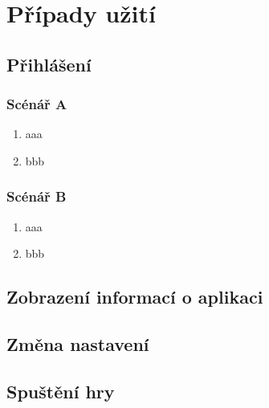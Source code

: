 \let\oldsubsection=\thesubsection
\renewcommand\thesubsection{UC\arabic{subsection}} %

\section{Případy užití}

\blind[1]

\subsection{Přihlášení}
\label{uc:login}

\subsubsection*{Scénář A}

\begin{enumerate}
    \item aaa
    \item bbb
\end{enumerate}

\subsubsection*{Scénář B}

\begin{enumerate}
    \item aaa
    \item bbb
\end{enumerate}

\blind[2]

\subsection{Zobrazení informací o aplikaci}

\blind[2]

\subsection{Změna nastavení}

\blind[2]

\subsection{Spuštění hry}

